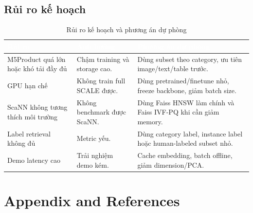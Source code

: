 \documentclass[12pt,a4paper]{article}
\begin{document}
\subsection{Rủi ro kế hoạch}
\begin{table}[htbp]
\centering
\begin{tabularx}{\linewidth}{@{}L{3.6cm}L{3.4cm}Y@{}}
\toprule
{}
\textcolor{white}{\textbf{Rủi ro}} & \textcolor{white}{\textbf{Ảnh hưởng}} & \textcolor{white}{\textbf{Phương án dự phòng}} \\
\midrule
M5Product quá lớn hoặc khó tải đầy đủ & Chậm training và storage cao. & Dùng subset theo category, ưu tiên image/text/table trước. \\
GPU hạn chế & Không train full SCALE được. & Dùng pretrained/finetune nhỏ, freeze backbone, giảm batch size. \\
ScaNN không tương thích môi trường & Không benchmark được ScaNN. & Dùng Faiss HNSW làm chính và Faiss IVF-PQ khi cần giảm memory. \\
Label retrieval không đủ & Metric yếu. & Dùng category label, instance label hoặc human-labeled subset nhỏ. \\
Demo latency cao & Trải nghiệm demo kém. & Cache embedding, batch offline, giảm dimension/PCA. \\
\bottomrule
\end{tabularx}
\caption{Rủi ro kế hoạch và phương án dự phòng}
\end{table}

\section{Appendix and References}
\end{document}
